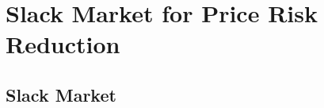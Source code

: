 \newcommand{\mypathslk}{../thesis/slk}
\chapter{Slack Market for Price Risk Reduction}

\section{Slack Market}
